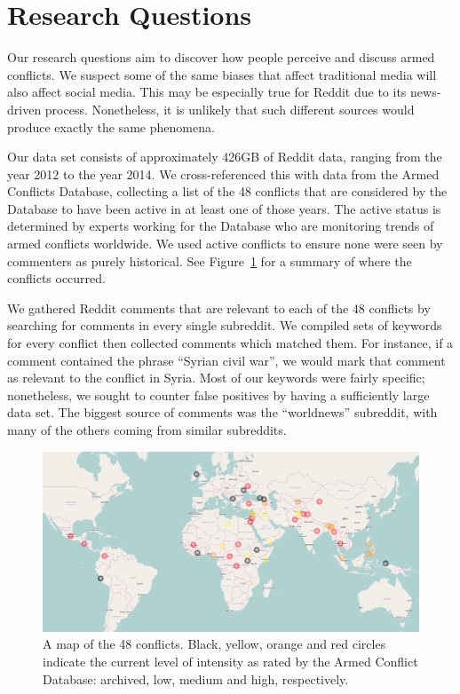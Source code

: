 \section{Research Questions}
Our research questions aim to discover how people perceive and discuss armed conflicts. We suspect some of the same biases that affect traditional media will also affect social media. This may be especially true for Reddit due to its news-driven process. Nonetheless, it is unlikely that such different sources would produce exactly the same phenomena. 

Our data set consists of approximately 426GB of Reddit data, ranging from the year 2012 to the year 2014. We cross-referenced this with data from the Armed Conflicts Database, collecting a list of the 48 conflicts that are considered by the Database to have been active in at least one of those years. The active status is determined by experts working for the Database who are monitoring trends of armed conflicts worldwide. We used active conflicts to ensure none were seen by commenters as purely historical. See Figure~\ref{conflicts} for a summary of where the conflicts occurred. 

We gathered Reddit comments that are relevant to each of the 48 conflicts by searching for comments in every single subreddit. We compiled sets of keywords for every conflict then collected comments which matched them. For instance, if a comment contained the phrase ``Syrian civil war'', we would mark that comment as relevant to the conflict in Syria. Most of our keywords were fairly specific; nonetheless, we sought to counter false positives by having a sufficiently large data set. The biggest source of comments was the ``worldnews'' subreddit, with many of the others coming from similar subreddits.

\begin{figure}
\centering
\includegraphics[width=0.9\columnwidth]{map}
\caption{A map of the 48 conflicts. Black, yellow, orange and red circles indicate the current level of intensity as rated by the Armed Conflict Database: archived, low, medium and high, respectively.}
\label{conflicts}
\end{figure}